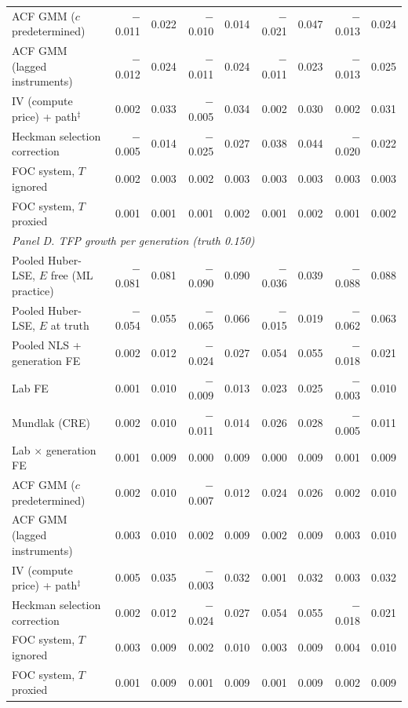 \begin{table}[!htbp]
\begin{threeparttable}
\begin{tabular}{lrrrrrrrr}
ACF GMM ($c$ predetermined) & $-$0.011 & 0.022 & $-$0.010 & 0.014 & $-$0.021 & 0.047 & $-$0.013 & 0.024 \\
ACF GMM (lagged instruments) & $-$0.012 & 0.024 & $-$0.011 & 0.024 & $-$0.011 & 0.023 & $-$0.013 & 0.025 \\
IV (compute price) + path$^{\ddagger}$ & 0.002 & 0.033 & $-$0.005 & 0.034 & 0.002 & 0.030 & 0.002 & 0.031 \\
Heckman selection correction & $-$0.005 & 0.014 & $-$0.025 & 0.027 & 0.038 & 0.044 & $-$0.020 & 0.022 \\
FOC system, $T$ ignored & 0.002 & 0.003 & 0.002 & 0.003 & 0.003 & 0.003 & 0.003 & 0.003 \\
FOC system, $T$ proxied & 0.001 & 0.001 & 0.001 & 0.002 & 0.001 & 0.002 & 0.001 & 0.002 \\
\midrule
\multicolumn{9}{l}{\textit{Panel D. TFP growth per generation (truth 0.150)}} \\
Pooled Huber-LSE, $E$ free (ML practice) & $-$0.081 & 0.081 & $-$0.090 & 0.090 & $-$0.036 & 0.039 & $-$0.088 & 0.088 \\
Pooled Huber-LSE, $E$ at truth & $-$0.054 & 0.055 & $-$0.065 & 0.066 & $-$0.015 & 0.019 & $-$0.062 & 0.063 \\
Pooled NLS + generation FE & 0.002 & 0.012 & $-$0.024 & 0.027 & 0.054 & 0.055 & $-$0.018 & 0.021 \\
Lab FE & 0.001 & 0.010 & $-$0.009 & 0.013 & 0.023 & 0.025 & $-$0.003 & 0.010 \\
Mundlak (CRE) & 0.002 & 0.010 & $-$0.011 & 0.014 & 0.026 & 0.028 & $-$0.005 & 0.011 \\
Lab $\times$ generation FE & 0.001 & 0.009 & 0.000 & 0.009 & 0.000 & 0.009 & 0.001 & 0.009 \\
ACF GMM ($c$ predetermined) & 0.002 & 0.010 & $-$0.007 & 0.012 & 0.024 & 0.026 & 0.002 & 0.010 \\
ACF GMM (lagged instruments) & 0.003 & 0.010 & 0.002 & 0.009 & 0.002 & 0.009 & 0.003 & 0.010 \\
IV (compute price) + path$^{\ddagger}$ & 0.005 & 0.035 & $-$0.003 & 0.032 & 0.001 & 0.032 & 0.003 & 0.032 \\
Heckman selection correction & 0.002 & 0.012 & $-$0.024 & 0.027 & 0.054 & 0.055 & $-$0.018 & 0.021 \\
FOC system, $T$ ignored & 0.003 & 0.009 & 0.002 & 0.010 & 0.003 & 0.009 & 0.004 & 0.010 \\
FOC system, $T$ proxied & 0.001 & 0.009 & 0.001 & 0.009 & 0.001 & 0.009 & 0.002 & 0.009 \\

\end{tabular}
\end{threeparttable}
\end{table}

